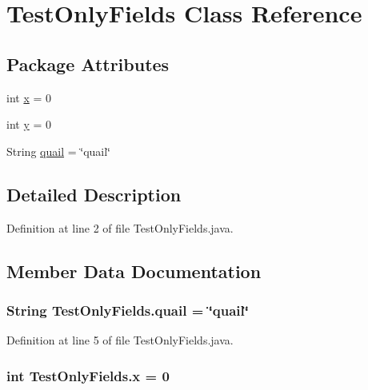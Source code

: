 \hypertarget{classTestOnlyFields}{
\section{TestOnlyFields Class Reference}
\label{classTestOnlyFields}
}
\subsection*{Package Attributes}
\begin{DoxyCompactItemize}
\item 
int \hyperlink{classTestOnlyFields_a5d676df6090e6efccab5a75838688561}{x} = 0
\item 
int \hyperlink{classTestOnlyFields_a0de494a2542663d26451138724b0e0ac}{y} = 0
\item 
String \hyperlink{classTestOnlyFields_abb8345497bd06bff5c00ea625c5edfe9}{quail} = \char`\"{}quail\char`\"{}
\end{DoxyCompactItemize}


\subsection{Detailed Description}


Definition at line 2 of file TestOnlyFields.java.



\subsection{Member Data Documentation}
\hypertarget{classTestOnlyFields_abb8345497bd06bff5c00ea625c5edfe9}{
\subsubsection[{quail}]{\setlength{\rightskip}{0pt plus 5cm}String {\bf TestOnlyFields.quail} = \char`\"{}quail\char`\"{}}}
\label{classTestOnlyFields_abb8345497bd06bff5c00ea625c5edfe9}


Definition at line 5 of file TestOnlyFields.java.

\hypertarget{classTestOnlyFields_a5d676df6090e6efccab5a75838688561}{
\subsubsection[{x}]{\setlength{\rightskip}{0pt plus 5cm}int {\bf TestOnlyFields.x} = 0}}
\label{classTestOnlyFields_a5d676df6090e6efccab5a75838688561}


